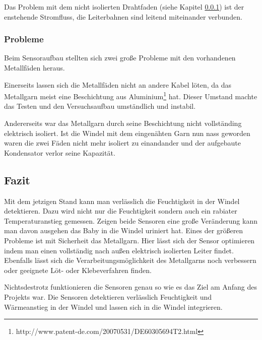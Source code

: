 Das Problem mit dem nicht isolierten Drahtfaden (siehe Kapitel \ref{subsubsec:sensor_probleme}) ist der enstehende Stromfluss, die Leiterbahnen sind leitend miteinander verbunden.

\subsubsection{Probleme}
\label{subsubsec:sensor_probleme}
Beim Sensoraufbau stellten sich zwei große Probleme mit den vorhandenen Metallfäden heraus.

Einerseits lassen sich die Metallfäden nicht an andere Kabel löten, da das Metallgarn meist eine Beschichtung aus Aluminium\footnote{http://www.patent-de.com/20070531/DE60305694T2.html} hat. Dieser Umstand machte das Testen und den Versuchsaufbau umständlich und instabil.

Andererseits war das Metallgarn durch seine Beschichtung nicht vollständing elektrisch isoliert. Ist die Windel mit dem eingenähten Garn nun nass geworden waren die zwei Fäden nicht mehr isoliert zu einandander und der aufgebaute Kondensator verlor seine Kapazität. 

\subsection{Fazit}
Mit dem jetzigen Stand kann man verlässlich die Feuchtigkeit in der Windel detektieren. Dazu wird nicht nur die Feuchtigkeit sondern auch ein rabiater Temperaturanstieg gemessen. Zeigen beide Sensoren eine große Veränderung kann man davon ausgehen das Baby in die Windel uriniert hat. 
Eines der größeren Probleme ist mit Sicherheit das Metallgarn. Hier lässt sich der Sensor optimieren indem man einen vollständig nach außen elektrisch isolierten Leiter findet. Ebenfalls lässt sich die Verarbeitungsmöglichkeit des Metallgarns noch verbessern oder geeignete Löt- oder Klebeverfahren finden.

Nichtsdestrotz funktionieren die Sensoren genau so wie es das Ziel am Anfang des Projekts war. Die Sensoren detektieren verlässlich Feuchtigkeit und Wärmeanstieg in der Windel und lassen sich in die Windel integrieren. 

\pagebreak
